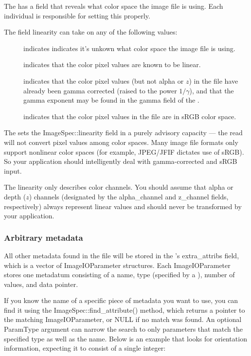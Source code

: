 The \ImageSpec has a field that reveals what color space the
image file is using.  Each individual \ImageInput is responsible for
setting this properly.

The \ImageSpec field {\cf linearity} can take on any of the
following values:
\begin{description}
\item[\halfspc \rm {}] indicates
  indicates it's unkown what color space the image file is using.
\item[\halfspc \rm {}] indicates that the
  color pixel values are known to be linear.
\item[\halfspc \rm {}] indicates
  that the color pixel values (but not alpha or $z$) in the file have
  already been gamma corrected (raised to the power $1/\gamma$), and
  that the gamma exponent may be found in the {\cf gamma} field of the
  \ImageSpec.
\item[\halfspc \rm {}] indicates that the
  color pixel values in the file are in sRGB color space.
\end{description}

The \ImageInput sets the {\cf ImageSpec::linearity} field in a
purely advisory capacity --- the {\cf read} will not convert pixel
values among color spaces.  Many image file formats only support
nonlinear color spaces (for example, JPEG/JFIF dictates use of sRGB).
So your application should intelligently deal with gamma-corrected and
sRGB input.

The linearity only describes color channels.  You should assume that
alpha or depth ($z$) channels (designated by the {\cf alpha_channel} and
{\cf z_channel} fields, respectively) always represent linear values and
should never be transformed by your application.

\subsubsection{Arbitrary metadata}

All other metadata found in the file will be stored in the
\ImageSpec's {\cf extra_attribs} field, which is a vector
of {\cf ImageIOParameter} structures.  Each {\cf ImageIOParameter}
stores one metadatum consisting of a name, type (specified by 
a \ParamBaseType), number of values, and data pointer.

If you know the name of a specific piece of metadata you want to use,
you can find it using the {\cf ImageSpec::find_attribute()}
method, which returns a pointer to the matching {\cf ImageIOParameter},
or {\cf NULL} if no match was found.  An optional {\cf ParamType}
argument can narrow the search to only parameters that match the
specified type as well as the name.  Below is an
example that looks for orientation information, expecting it to consist 
of a single integer:


